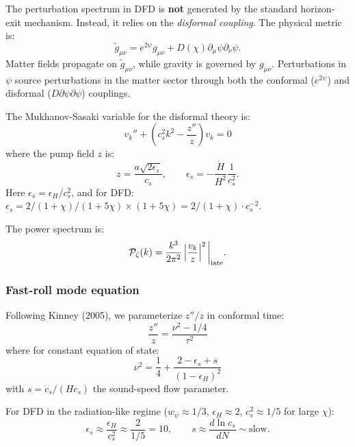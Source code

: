 \documentclass[11pt,a4paper]{article}
\begin{document}
The perturbation spectrum in DFD is \textbf{not} generated by the standard horizon-exit mechanism. Instead, it relies on the \emph{disformal coupling}. The physical metric is:
\begin{equation}
\tilde{g}_{\mu\nu} = e^{2\psi}g_{\mu\nu} + D(\chi)\partial_\mu\psi\partial_\nu\psi.
\end{equation}
Matter fields propagate on $\tilde{g}_{\mu\nu}$, while gravity is governed by $g_{\mu\nu}$. Perturbations in $\psi$ source perturbations in the matter sector through both the conformal ($e^{2\psi}$) and disformal ($D\partial\psi\partial\psi$) couplings.

The Mukhanov-Sasaki variable for the disformal theory is:
\begin{equation}\label{eq:MS-disformal}
v_k'' + \left(c_s^2 k^2 - \frac{z''}{z}\right)v_k = 0
\end{equation}
where the pump field $z$ is:
\begin{equation}
z = \frac{a\sqrt{2\epsilon_s}}{c_s}, \qquad \epsilon_s = -\frac{\dot{H}}{H^2}\frac{1}{c_s^2}.
\end{equation}
Here $\epsilon_s = \epsilon_H/c_s^2$, and for DFD: $\epsilon_s = 2/(1+\chi)/(1+5\chi) \times (1+5\chi) = 2/(1+\chi) \cdot c_s^{-2}$.

The power spectrum is:
\begin{equation}
\mathcal{P}_\zeta(k) = \frac{k^3}{2\pi^2}\left|\frac{v_k}{z}\right|^2\bigg|_{\rm late}.
\end{equation}

\subsubsection{Fast-roll mode equation}

Following Kinney (2005), we parameterize $z''/z$ in conformal time:
\begin{equation}
\frac{z''}{z} = \frac{\nu^2 - 1/4}{\tau^2}
\end{equation}
where for constant equation of state:
\begin{equation}
\nu^2 = \frac{1}{4} + \frac{2 - \epsilon_s + s}{(1 - \epsilon_H)^2}
\end{equation}
with $s = \dot{c}_s/(Hc_s)$ the sound-speed flow parameter.

For DFD in the radiation-like regime ($w_\psi \approx 1/3$, $\epsilon_H \approx 2$, $c_s^2 \approx 1/5$ for large $\chi$):
\begin{equation}
\epsilon_s \approx \frac{\epsilon_H}{c_s^2} \approx \frac{2}{1/5} = 10, \qquad s \approx \frac{d\ln c_s}{dN} \sim \text{slow}.
\end{equation}
\end{document}
